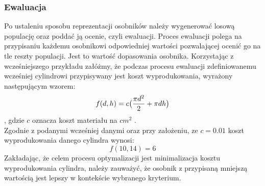 \documentclass[twoside]{iisthesis}
\begin{document}
\subsubsection{Ewaluacja}
Po ustaleniu sposobu reprezentacji osobników należy wygenerować losową populację oraz poddać ją ocenie, czyli ewaluacji. Proces ewaluacji polega na przypisaniu każdemu osobnikowi odpowiedniej wartości pozwalającej ocenić go na tle reszty populacji. Jest to wartość dopasowania osobnika. Korzystając z wcześniejszego przykładu załóżmy, że podczas procesu ewaluacji zdefiniowanemu wcześniej cylindrowi przypisywany jest koszt wyprodukowania, wyrażony następującym wzorem:
\begin{equation}
f(d,h) = c\big{(}\dfrac{\pi d^{2}}{2} + \pi dh\big{)}
\end{equation}
, gdzie $c$ oznacza koszt materiału na $cm^{2}$ \cite{book}.\\
Zgodnie z podanymi wcześniej danymi oraz przy założeniu, ze $c = 0.01$ koszt wyprodukowania danego cylindra wynosi:
\[f(10, 14) = 6\]
Zakładając, że celem procesu optymalizacji jest minimalizacja kosztu wyprodukowania cylindra, należy zauważyć, że osobnik z przypisaną mniejszą wartością jest lepszy w kontekście wybranego kryterium.
\end{document}
